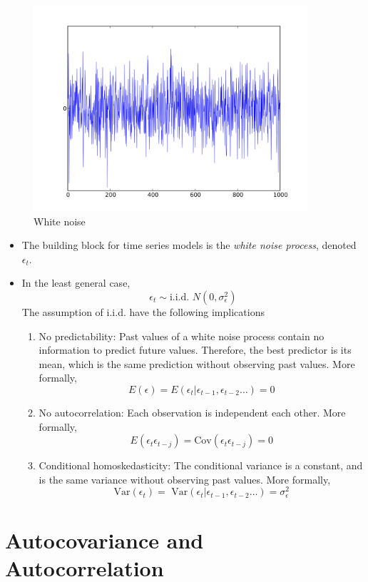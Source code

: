 \documentclass[11pt]{article}
\begin{document}
\begin{figure}[H] 
    \centering 
    \includegraphics[width=4in]{imgs/white_noise.png}
    \caption{White noise}
\end{figure}

\begin{itemize}
    \item The building block for time series models is the \textit{white noise process}, 
    denoted $\epsilon_t$.
    \item In the least general case,
    \[ \epsilon_t \sim \text{i.i.d. } N(0, \sigma_{\epsilon}^{2})\]
    The assumption of i.i.d. have the following implications 
    \begin{enumerate}
        \item No predictability: Past values of a white noise process contain no information to predict future 
        values. Therefore, the best predictor is its mean, which is the same prediction without 
        observing past values. More formally, 
        \[E(\epsilon) = E(\epsilon_t | \epsilon_{t-1}, \epsilon_{t-2} \ldots) = 0\]
        \item No autocorrelation: Each observation is independent each other. More formally, 
        \[E(\epsilon_t \epsilon_{t-j}) = \text{Cov}(\epsilon_t \epsilon_{t-j})=0\]
        \item Conditional homoskedasticity: The conditional variance is a constant, and is 
        the same variance without observing past values. More formally, 
        \[\text{Var}(\epsilon_t) = \text{ Var}(\epsilon_t | \epsilon_{t-1}, \epsilon_{t-2} 
        \ldots) = \sigma_{\epsilon}^{2}\]
    \end{enumerate}
\end{itemize}

\section{Autocovariance and Autocorrelation}
\end{document}
